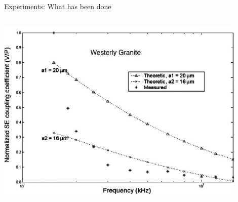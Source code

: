 \documentclass[utf8]{beamer} \usetheme{lfcr} %
\begin{document}
\begin{frame}{Experiments: What has been done}
\begin{columns}
\begin{column}{0.5\textwidth}
      \includegraphics[width=0.9\textwidth]{Zhuetal2008_b_3}%
    \end{column}
  \end{columns}
 
\end{frame}
%
\end{document}
